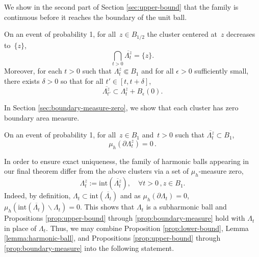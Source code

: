 \documentclass[12pt]{amsart}
\numberwithin{equation}{section}
\newcommand{\cluster}[2]{\hyperref[eq:non-co-set]{\mathit{\Lambda}^{#1}_{#2}}}
\newcommand{\regcluster}[2]{\hyperref[eq:regular-cluster]{\Lambda^{#1}_{#2}}}
\begin{document}
	We show in the second part of Section \ref{sec:upper-bound} that the family is continuous before it reaches the boundary of the unit ball. 
	\begin{prop} \label{prop:continuity}
		On an event of probability 1, for all~$z \in B_{1/2}$ the cluster centered at~$z$ decreases to~$\{z\}$,  
		\begin{equation} \label{eq:contains-origin}
		\bigcap_{t > 0} \overline{{{\cluster{z}{t}}}} = \{z\}.
		\end{equation} 
		Moreover, for each $t > 0$ such that ${\cluster{z}{t}} \Subset B_1$ and for all $\epsilon > 0$ sufficiently small, there exists $\delta > 0$ so that for all 
		$t' \in [t, t + \delta]$, 
		\begin{equation} \label{eq:continuity}
		\overline{{\cluster{z}{t'}}} \subset {\cluster{z}{t}} + B_{\epsilon}(0).
		\end{equation}
	\end{prop}
	In Section \ref{sec:boundary-measure-zero}, we show that each cluster has zero boundary area measure.   
	\begin{prop} \label{prop:boundary-measure}
		On an event of probability 1, for all~$z \in B_1$ and~$t > 0$ such that $\overline{{{\cluster{z}{t}}}} \subset B_1$, 
		\begin{equation}
		\mu_h (\partial {\cluster{z}{t}}) = 0 \, . 
		\end{equation}
	\end{prop}
	
	
	In order to ensure exact uniqueness, the family of harmonic balls appearing in our final theorem differ from the above clusters
	via a set of $\mu_h$-measure zero, 
	\begin{equation} \label{eq:regular-cluster}
	{\regcluster{z}{t}} := \mathrm{int}(\overline{{{\cluster{z}{t}}}}), \quad \forall t >0 \, , z \in B_1.
	\end{equation}
	Indeed, by definition, ${\cluster{}{t}} \subset \mathrm{int}(\overline{{{\cluster{}{t}}}})$ and as $\mu_h(\partial {\cluster{}{t}}) = 0$, $\mu_h(\mathrm{int}(\overline{{{\cluster{}{t}}}}) \backslash {\cluster{}{t}}) = 0$. This shows that ${\regcluster{}{t}}$ is a subharmonic ball and Propositions \ref{prop:upper-bound} through \ref{prop:boundary-measure} 
	hold with ${\regcluster{}{t}}$ in place of ${\cluster{}{t}}$. Thus, we may combine Proposition \ref{prop:lower-bound}, Lemma \ref{lemma:harmonic-ball}, and Propositions \ref{prop:upper-bound} through \ref{prop:boundary-measure} into the following statement. 
	
\end{document}
